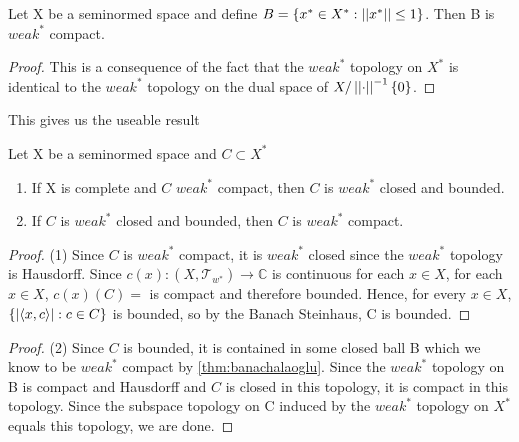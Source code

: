 \begin{cor}
    Let X be a seminormed space and define $B=\{x^* \in X^*: \left|\left| x^* \right|\right| \leq 1\}$. Then B is $weak^*$ compact. 
    \begin{proof} 
        This is  a consequence of the fact that the $weak^*$ topology on $X^*$ is identical to the $weak^*$ topology on the dual space of $X/\left|\left| \cdot \right|\right|^{-1}\{0\}$. 
    \end{proof} 
\end{cor} 
This gives us the useable result
\begin{cor}
    \label{thm:banachalaoglumorales}
    Let X be a seminormed space and $C \subset X^*$ 
    \begin{enumerate}
        \item If X is complete and $C$ $weak^*$ compact, then $C$ is $weak^*$ closed and bounded. 
        \item If $C$ is $weak^*$ closed and bounded, then $C$ is $weak^*$ compact. 
    \end{enumerate}
    \begin{proof}(1)
        Since $C$ is $weak^*$ compact, it is $weak^*$ closed since the $weak^*$ topology is Hausdorff. Since $c(x):(X,\mathcal{T}_{w^*}) \to \mathbb{C}$ is continuous for each $x \in X$, for each $x \in X$, $c(x)(C)=$ is compact and therefore bounded. Hence, for every $x \in X$, $\{\left| \left\langle x,c \right\rangle \right| : c \in C\}$ is bounded, so by the Banach Steinhaus, C is bounded. 
    \end{proof}
    \begin{proof}(2)
        Since $C$ is bounded, it is contained in some closed ball B which we know to be $weak^*$ compact by \ref{thm:banachalaoglu}. Since the $weak^*$ topology on B is compact and  Hausdorff and $C$ is closed in this topology, it is compact in this topology. Since the subspace topology on C induced by the $weak^*$ topology on $X^*$ equals this topology, we are done.  
    \end{proof} 
\end{cor} 
